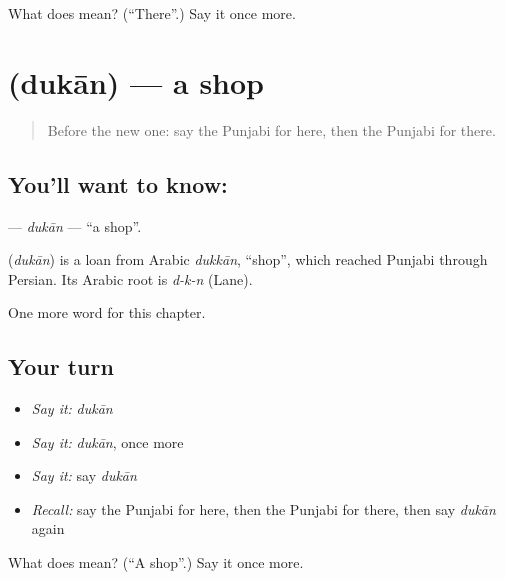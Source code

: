 \begin{tcolorbox}[breakable,colback=teal!4,colframe=teal!35!black,title={Before you move on}]
What does  mean? (\textquotedblleft{}There\textquotedblright{}.) Say it once more.
\end{tcolorbox}
\section[\texorpdfstring{\pa{ਦੁਕਾਨ} (dukān)}{ਦੁਕਾਨ (dukān)}]{ (dukān) — a shop}

\label{lesson:PA-C89-dukan}



\begin{quote}
Before the new one: say the Punjabi for here, then the Punjabi for there.
\end{quote}

\subsection*{You'll want to know: }
\textbf{} — \emph{dukān} — \textquotedblleft{}a shop\textquotedblright{}.

\begin{cousinweb}
\textbf{} (\emph{dukān}) is a loan from Arabic \emph{dukkān}, \textquotedblleft{}shop\textquotedblright{}, which reached Punjabi through Persian. Its Arabic root is \emph{d-k-n} (Lane).
\end{cousinweb}

\begin{grammarlens}[title={What you've built}]
One more word for this chapter.
\end{grammarlens}

\subsection*{Your turn}
\begin{itemize}
\raggedright
  \item \emph{Say it:} \emph{dukān}
  \item \emph{Say it:} \emph{dukān}, once more
  \item \emph{Say it:} say \emph{dukān}
  \item \emph{Recall:} say the Punjabi for here, then the Punjabi for there, then say \emph{dukān} again
\end{itemize}

\begin{tcolorbox}[breakable,colback=teal!4,colframe=teal!35!black,title={Before you move on}]
What does  mean? (\textquotedblleft{}A shop\textquotedblright{}.) Say it once more.
\end{tcolorbox}
